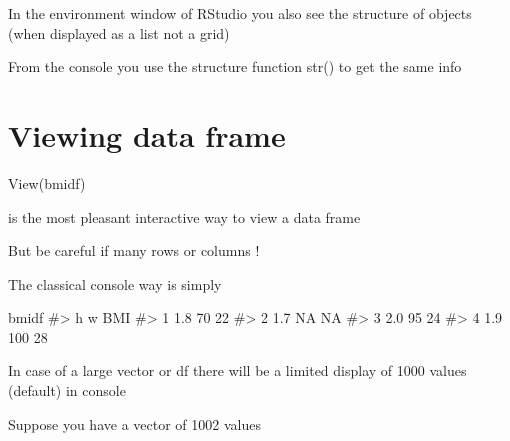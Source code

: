 \documentclass[
  letterpaper,
  DIV=11,
  numbers=noendperiod]{scrreprt}
\newenvironment{Shaded}{\begin{snugshade}}{\end{snugshade}}
\newcommand{\CommentTok}[1]{\textcolor[rgb]{0.37,0.37,0.37}{#1}}
\newcommand{\FunctionTok}[1]{\textcolor[rgb]{0.28,0.35,0.67}{#1}}
\newcommand{\NormalTok}[1]{\textcolor[rgb]{0.00,0.23,0.31}{#1}}
\begin{document}
In the environment window of RStudio you also see the structure of
objects (when displayed as a list not a grid)

From the console you use the structure function str() to get the same
info

\begin{Shaded}
\end{Shaded}

\section{Viewing data frame}\label{viewing-data-frame}

\begin{Shaded}
\begin{Highlighting}[]
\FunctionTok{View}\NormalTok{(bmidf)}
\end{Highlighting}
\end{Shaded}

is the most pleasant interactive way to view a data frame

But be careful if many rows or columns !

The classical console way is simply

\begin{Shaded}
\begin{Highlighting}[]
\NormalTok{bmidf}
\CommentTok{\#\textgreater{}     h   w BMI}
\CommentTok{\#\textgreater{} 1 1.8  70  22}
\CommentTok{\#\textgreater{} 2 1.7  NA  NA}
\CommentTok{\#\textgreater{} 3 2.0  95  24}
\CommentTok{\#\textgreater{} 4 1.9 100  28}
\end{Highlighting}
\end{Shaded}

In case of a large vector or df there will be a limited display of 1000
values (default) in console

Suppose you have a vector of 1002 values
\end{document}
